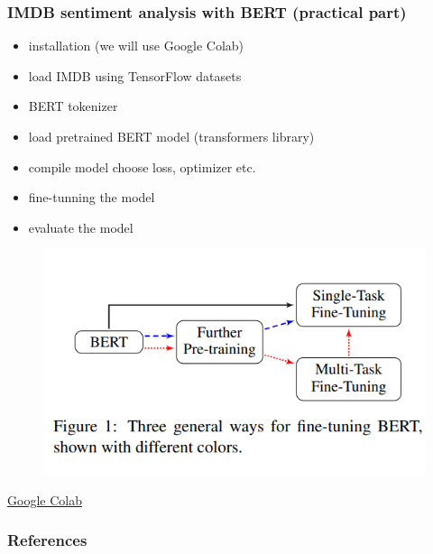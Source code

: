 \documentclass{beamer}
\begin{document}
\begin{frame}
    \frametitle{IMDB sentiment analysis with BERT (practical part)}
    \begin{itemize}
        \item installation (we will use Google Colab)
        \item load IMDB using TensorFlow datasets
        \item BERT tokenizer
        \item load pretrained BERT model (transformers library)
        \item compile model choose loss, optimizer etc.
        \item fine-tunning the model
        \item evaluate the model
    \end{itemize}

    \begin{figure}
    \includegraphics[scale=0.28]{images/fine-tunning-strategies.png}
    \end{figure}

\end{frame}



\begin{frame}

\Huge\centerline{\href{
    https://colab.research.google.com/drive/1934Mm2cwSSfT5bvi78-AExAl-hSfxCbq}{Google Colab}
}

\end{frame}



\begin{frame}[allowframebreaks]
\frametitle{References}
    \printbibliography
\end{frame}

\end{document}
